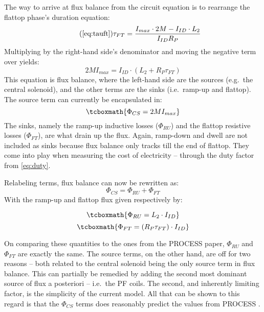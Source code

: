 The way to arrive at flux balance from the circuit equation is to rearrange the flattop phase's duration equation:
\begin{equation}
	\tag{\ref{eq:tauft}}
	\tau_{FT} = \frac{ I_{max} \cdot 2 M - I_{ID} \cdot  L_2 }{I_{ID} R_P}
\end{equation}
Multiplying by the right-hand side's denominator and moving the negative term over yields:
\begin{equation}
	2 M I_{max} = I_{ID} \cdot \left( L_2 + R_P \tau_{FT} \right)
\end{equation}
This equation is flux balance, where the left-hand side are the sources (e.g.\ the central solenoid), and the other terms are the sinks (i.e.\ ramp-up and flattop). The source term can currently be encapsulated in:
\begin{equation}
	\label{eq:phics}
	\tcboxmath{
	\Phi_{CS} = 2 M I_{max}
	}
\end{equation}
The sinks, namely the ramp-up inductive losses ($\Phi_{RU}$) and the flattop resistive losses ($\Phi_{FT}$), are what drain up the flux. Again, ramp-down and dwell are not included as sinks because flux balance only tracks till the end of flattop. They come into play when measuring the cost of electricity -- through the duty factor from \cref{eq:duty}.

Relabeling terms, flux balance can now be rewritten as:
\begin{equation}
	\Phi_{CS} = \Phi_{RU} + \Phi_{FT}
\end{equation}
With the ramp-up and flattop flux given respectively by:

\begin{equation}
	\label{eq:phiru}
	\tcboxmath{
	\Phi_{RU} = L_2 \cdot I_{ID}
	}
\end{equation}
\begin{equation}
	\label{eq:phift}
	\tcboxmath{
	\Phi_{FT} = ( R_P \tau_{FT} ) \cdot I_{ID}
	}
\end{equation}

On comparing these quantities to the ones from the PROCESS paper,\cite{process} $\Phi_{RU}$ and $\Phi_{FT}$ are exactly the same. The source terms, on the other hand, are off for two reasons -- both related to the central solenoid being the only source term in flux balance. This can partially be remedied by adding the second most dominant source of flux a posteriori -- i.e.\ the PF coils. The second, and inherently limiting factor, is the simplicity of the current model. All that can be shown to this regard is that the $\Phi_{CS}$ terms does reasonably predict the values from  PROCESS .\cite{inputfile}

